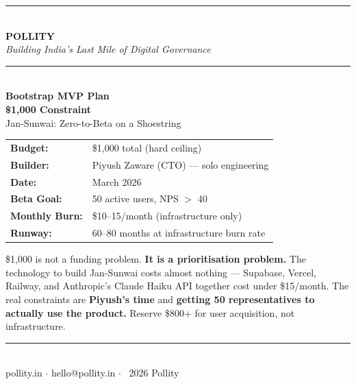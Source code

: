 \documentclass[12pt, a4paper]{article}
\begin{document}
\begin{titlepage}
    \centering
    \vspace*{1.5cm}

    {\color{pollityblue}\rule{\linewidth}{2pt}}\\[0.4cm]
    {\Huge\bfseries\color{pollityblue} POLLITY}\\[0.3cm]
    {\large\itshape Building India's Last Mile of Digital Governance}\\[0.2cm]
    {\color{pollityblue}\rule{\linewidth}{2pt}}\\[1.2cm]

    {\LARGE\bfseries Bootstrap MVP Plan}\\[0.4cm]
    {\Large\color{warnred}\bfseries \$1,000 Constraint}\\[0.4cm]
    {\large Jan-Sunwai: Zero-to-Beta on a Shoestring}\\[1.2cm]

    \begin{tabular}{ll}
        \textbf{Budget:}          & \$1,000 total (hard ceiling) \\[0.3em]
        \textbf{Builder:}         & Piyush Zaware (CTO) --- solo engineering \\[0.3em]
        \textbf{Date:}            & March 2026 \\[0.3em]
        \textbf{Beta Goal:}       & 50 active users, NPS $>$ 40 \\[0.3em]
        \textbf{Monthly Burn:}    & \$10--15/month (infrastructure only) \\[0.3em]
        \textbf{Runway:}          & 60--80 months at infrastructure burn rate \\
    \end{tabular}

    \vspace{1.5cm}

    \begin{tcolorbox}[
        colback=lightred,
        colframe=warnred,
        boxrule=1.5pt,
        arc=4pt,
        title={\bfseries\color{warnred} Constraint Reframe},
        fonttitle=\bfseries
    ]
    \$1,000 is not a funding problem. \textbf{It is a prioritisation problem.}
    The technology to build Jan-Sunwai costs almost nothing --- Supabase, Vercel,
    Railway, and Anthropic's Claude Haiku API together cost under \$15/month.
    The real constraints are \textbf{Piyush's time} and \textbf{getting 50 representatives
    to actually use the product.} Reserve \$800+ for user acquisition,
    not infrastructure.
    \end{tcolorbox}

    \vfill
    {\color{midgray}\rule{0.5\linewidth}{0.5pt}}\\[0.3cm]
    {\small pollity.in \quad $\cdot$ \quad hello@pollity.in \quad $\cdot$ \quad \textcopyright\ 2026 Pollity}
\end{titlepage}
\end{document}

